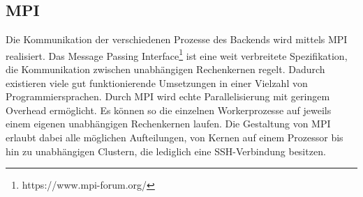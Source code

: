 \subsection{MPI}

Die Kommunikation der verschiedenen Prozesse des Backends wird mittels MPI realisiert.
Das Message Passing Interface\footnote{https://www.mpi-forum.org/} ist eine weit verbreitete Spezifikation, die Kommunikation zwischen unabhängigen Rechenkernen regelt. Dadurch existieren viele gut funktionierende Umsetzungen in einer Vielzahl von Programmiersprachen. Durch MPI wird echte Parallelisierung mit geringem Overhead ermöglicht. Es können so die einzelnen Workerprozesse auf jeweils einem eigenen unabhängigen Rechenkernen laufen. Die Gestaltung von MPI erlaubt dabei alle möglichen Aufteilungen, von Kernen auf einem Prozessor bis hin zu unabhängigen Clustern, die lediglich eine SSH-Verbindung besitzen.


